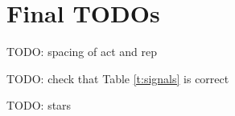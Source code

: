\documentclass[12pt,notitlepage]{article}
\newcommand{\TODO}[1]{\textrm{\color{red}TODO: #1}}
\begin{document}
\clearpage

\section*{Final TODOs}

\TODO{spacing of act and rep}

\TODO{check that Table \ref{t:signals} is correct}

\TODO{stars}


\clearpage

\SHOWTODOS




\leavevmode\vfill{\tiny\color{lightgray}\hfill{\DTMnow}}
\end{document}

